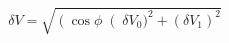 \begin{equation}
\label{eq:delta_V_Malus}
\delta V = \sqrt{ \left(\cos{\phi}\right(\delta V_0)^2 + (\delta V_1)^2}
\end{equation}